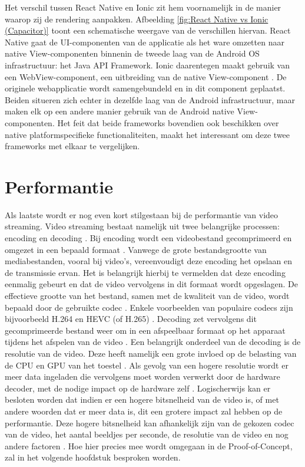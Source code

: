 Het verschil tussen React Native en Ionic zit hem voornamelijk in de manier waarop zij de rendering aanpakken. Afbeelding \ref{fig:React Native vs Ionic (Capacitor)} toont een schematische weergave van de verschillen hiervan. React Native gaat de UI-componenten van de applicatie als het ware omzetten naar native View-componenten binnenin de tweede laag van de Android OS infrastructuur: het Java API Framework. Ionic daarentegen maakt gebruik van een WebView-component, een uitbreiding van de native View-component \autocite{Bron23}. De originele webapplicatie wordt samengebundeld en in dit component geplaatst. Beiden situeren zich echter in dezelfde laag van de Android infrastructuur, maar maken elk op een andere manier gebruik van de Android native View-componenten. Het feit dat beide frameworks bovendien ook beschikken over native platformspecifieke functionaliteiten, maakt het interessant om deze twee frameworks met elkaar te vergelijken.


\section{Performantie}
\label{sec:performantie}

Als laatste wordt er nog even kort stilgestaan bij de performantie van video streaming. Video streaming bestaat namelijk uit twee belangrijke processen: encoding en decoding \autocite{Bron25, Bron24}. Bij encoding wordt een videobestand gecomprimeerd en omgezet in een bepaald formaat \autocite{Bron24}. Vanwege de grote bestandsgrootte van mediabestanden, vooral bij video's, vereenvoudigt deze encoding het opslaan en de transmissie ervan. Het is belangrijk hierbij te vermelden dat deze encoding eenmalig gebeurt en dat de video vervolgens in dit formaat wordt opgeslagen. De effectieve grootte van het bestand, samen met de kwaliteit van de video, wordt bepaald door de gebruikte codec \autocite{Bron24}. Enkele voorbeelden van populaire codecs zijn bijvoorbeeld H.264 en HEVC (of H.265) \autocite{Bron25}. Decoding zet vervolgens dit gecomprimeerde bestand weer om in een afspeelbaar formaat op het apparaat tijdens het afspelen van de video \autocite{Bron25, Bron24}. Een belangrijk onderdeel van de decoding is de resolutie van de video. Deze heeft namelijk een grote invloed op de belasting van de CPU en GPU van het toestel \autocite{Bron26}. Als gevolg van een hogere resolutie wordt er meer data ingeladen die vervolgens moet worden verwerkt door de hardware decoder, met de nodige impact op de hardware zelf \autocite{Bron26}. Logischerwijs kan er besloten worden dat indien er een hogere bitsnelheid van de video is, of met andere woorden dat er meer data is, dit een grotere impact zal hebben op de performantie. Deze hogere bitsnelheid kan afhankelijk zijn van de gekozen codec van de video, het aantal beeldjes per seconde, de resolutie van de video en nog andere factoren \autocite{Bron25}. Hoe hier precies mee wordt omgegaan in de Proof-of-Concept, zal in het volgende hoofdstuk besproken worden.




